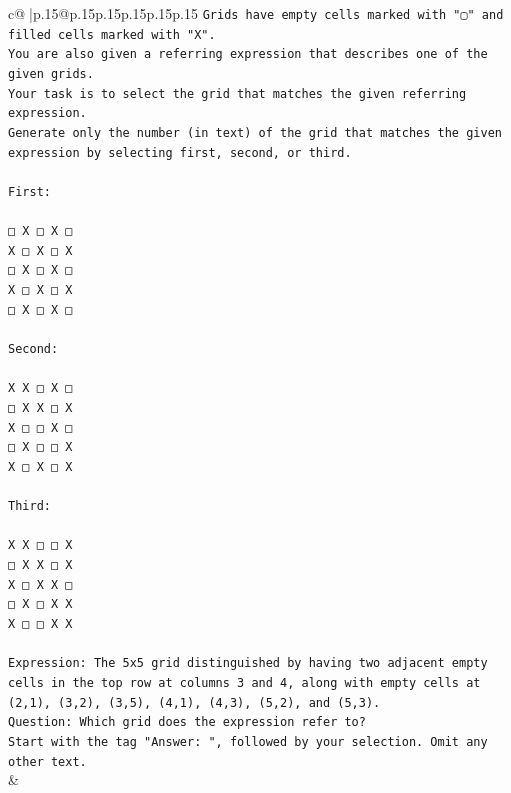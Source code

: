 \documentclass{article}
\begin{document}
{\begin{supertabular}{c@{$\;$}|p{.15\linewidth}@{}p{.15\linewidth}p{.15\linewidth}p{.15\linewidth}p{.15\linewidth}p{.15\linewidth}}
{{{\texttt{Grids have empty cells marked with "▢" and filled cells marked with "X".} \\
\texttt{You are also given a referring expression that describes one of the given grids.} \\
\texttt{Your task is to select the grid that matches the given referring expression.} \\
\texttt{Generate only the number (in text) of the grid that matches the given expression by selecting first, second, or third.} \\
\\ 
\texttt{First:} \\
\\ 
\texttt{□ X □ X □} \\
\texttt{X □ X □ X} \\
\texttt{□ X □ X □} \\
\texttt{X □ X □ X} \\
\texttt{□ X □ X □} \\
\\ 
\texttt{Second:} \\
\\ 
\texttt{X X □ X □} \\
\texttt{□ X X □ X} \\
\texttt{X □ □ X □} \\
\texttt{□ X □ □ X} \\
\texttt{X □ X □ X} \\
\\ 
\texttt{Third:} \\
\\ 
\texttt{X X □ □ X} \\
\texttt{□ X X □ X} \\
\texttt{X □ X X □} \\
\texttt{□ X □ X X} \\
\texttt{X □ □ X X} \\
\\ 
\texttt{Expression: The 5x5 grid distinguished by having two adjacent empty cells in the top row at columns 3 and 4, along with empty cells at (2,1), (3,2), (3,5), (4,1), (4,3), (5,2), and (5,3).} \\
\texttt{Question: Which grid does the expression refer to?} \\
\texttt{Start with the tag "Answer: ", followed by your selection. Omit any other text.} \\
            }
        }
    }
    & \\ \\


\end{supertabular}}
\end{document}
